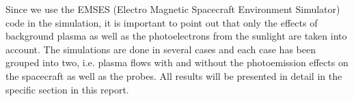 Since we use the EMSES (Electro Magnetic Spacecraft Environment Simulator) code \citep{miyake_plasma_2013} in the
simulation, it is important to point out that only the effects of background plasma as
well as the photoelectrons from the sunlight are taken into account. The simulations
are done in several cases and each case has been grouped into two, i.e. plasma
flows with and without the photoemission effects on the spacecraft as well as the probes.
All results will be presented in detail in the specific section in this report.
